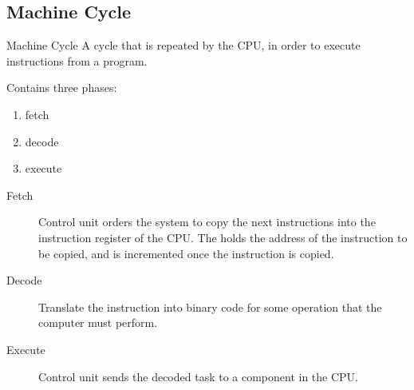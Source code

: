 \documentclass[../notes.tex]{subfiles}
\begin{document}
				\subsection{Machine Cycle}
					\begin{definition}{Machine Cycle}
						A cycle that is repeated by the CPU, in order to execute instructions from a program.
					\end{definition}
					Contains three phases:
					\begin{enumerate}[nosep]
						\item fetch
						\item decode
						\item execute
					\end{enumerate}
					\begin{description}
						\item[Fetch] Control unit orders the system to copy the next instructions into the instruction register of the CPU. The  holds the address of the instruction to be copied, and is incremented once the instruction is copied.
						\item[Decode] Translate the instruction into binary code for some operation that the computer must perform.
						\item[Execute] Control unit sends the decoded task to a component in the CPU.  
					\end{description}
				\pagebreak
\end{document}
